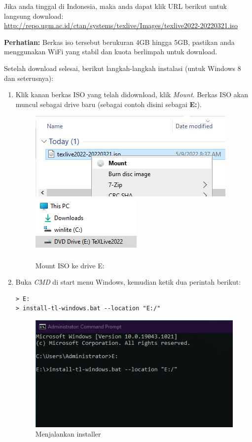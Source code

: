 \documentclass{book} %
\begin{document}
	Jika anda tinggal di Indonesia, maka anda dapat klik URL berikut untuk langsung download:\\
	\url{http://repo.ugm.ac.id/ctan/systems/texlive/Images/texlive2022-20220321.iso}

	\bigskip

	\textbf{Perhatian:} Berkas iso tersebut berukuran 4GB hingga 5GB, pastikan anda menggunakan WiFi yang stabil dan kuota berlimpah untuk download.

	\newpage

	Setelah download selesai, berikut langkah-langkah instalasi (untuk Windows 8 dan seterusnya):

	\begin{enumerate}
		\item Klik kanan berkas ISO yang telah didownload, klik \textit{Mount}.
		Berkas ISO akan muncul sebagai drive baru (sebagai contoh disini sebagai \textbf{E:}).
		\begin{figure}[!ht]
			\centering
			\includegraphics[width=0.3\linewidth]{images/texlivewin0}
			\includegraphics[width=0.3\linewidth]{images/texlivewin1}
			\caption{Mount ISO ke drive E:}
		\end{figure}

		\item Buka \textit{CMD} di start menu Windows, kemudian ketik dua perintah berikut:
		\begin{verbatim}
> E:
> install-tl-windows.bat --location "E:/"
		\end{verbatim}

		\begin{figure}[!ht]
			\centering
			\includegraphics[width=0.4\linewidth]{images/texlivewin2}
			\caption{Menjalankan installer}
		\end{figure}


\end{enumerate}
\end{document}
